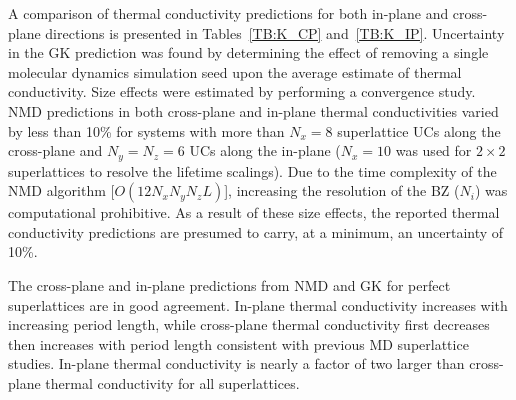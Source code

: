 \documentclass[aps,prb,preprint,preprintnumbers,amsmath,amssymb,floatfix,superscriptaddress]{revtex4}
\begin{document}
A comparison of thermal conductivity predictions for both in-plane and cross-plane directions is presented in Tables~\ref{TB:K_CP} and~\ref{TB:K_IP}. Uncertainty in the GK prediction was found by determining the effect of removing a single molecular dynamics simulation seed upon the average estimate of thermal conductivity. Size effects were estimated by performing a convergence study. NMD predictions in both cross-plane and in-plane thermal conductivities varied by less than 10\% for systems with more than $N_x=8$ superlattice UCs along the cross-plane and $N_y=N_z=6$ UCs along the in-plane ($N_x=10$ was used for $2\times2$ superlattices to resolve the lifetime scalings). Due to the time complexity of the NMD algorithm [$O(12N_x  N_y N_z L)$], increasing the resolution of the BZ ($N_i$) was computational prohibitive. As a result of these size effects, the reported thermal conductivity predictions are presumed to carry, at a minimum, an uncertainty of 10\%.

The cross-plane and in-plane predictions from NMD and GK for perfect superlattices are in good agreement. In-plane thermal conductivity increases with increasing period length, while cross-plane thermal conductivity first decreases then increases with period length consistent with previous MD superlattice studies. \cite {PhysRevB.72.174302} In-plane thermal conductivity is nearly a factor of two larger than cross-plane thermal conductivity for all superlattices.
\end{document}
